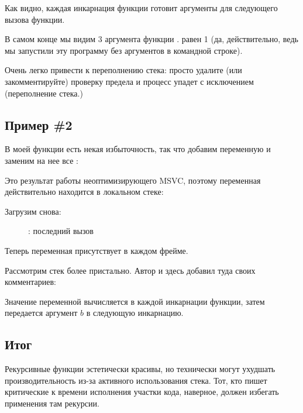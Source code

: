 
Как видно, каждая инкарнация функции готовит аргументы для следующего вызова функции.

В самом конце мы видим 3 аргумента функции \main. 
 равен 1 (да, действительно, ведь мы запустили эту программу
без аргументов в командной строке).

Очень легко привести к переполнению стека: просто удалите (или закомментируйте) проверку
предела и процесс упадет с исключением  (переполнение стека.)

\subsection{Пример \#2}

В моей функции есть некая избыточность, так что добавим переменную  и заменим на нее
все :



Это результат работы неоптимизирующего MSVC, поэтому переменная  действительно
находится в локальном стеке:



\clearpage
Загрузим \olly снова:

\begin{figure}[H]
\centering
{}
\caption{\olly: последний вызов \ttf{}}
\label{fig:fib_olly2}
\end{figure}

Теперь переменная  присутствует в каждом фрейме.

\clearpage
Рассмотрим стек более пристально. Автор и здесь добавил туда своих комментариев:



Значение переменной  вычисляется в каждой инкарнации функции, затем передается
аргумент $b$ в следующую инкарнацию.

\subsection{Итог}

\label{Recursion_and_tail_call}
\myindex{\Recursion}
Рекурсивные функции эстетически красивы, но технически могут ухудшать производительность
из-за активного использования стека.
Тот, кто пишет критические к времени исполнения участки кода, наверное, должен избегать 
применения там рекурсии.

